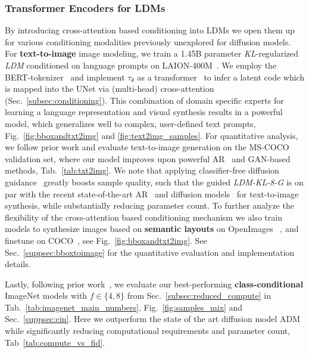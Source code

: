 \documentclass[10pt,twocolumn,letterpaper]{article}
\begin{document}
\subsubsection{Transformer Encoders for LDMs}
%
\label{subsubsec:crossattn2img}
\vspace{-0.5em}
By introducing cross-attention based conditioning into LDMs
we open them up for various
%
 conditioning modalities previously unexplored for diffusion models. 
%
%
%
%
For \textbf{text-to-image} image modeling, we train a 1.45B parameter \emph{KL}-regularized \emph{LDM} conditioned on language prompts on LAION-400M~\cite{schuhmann2021laion400m}. 
We employ the BERT-tokenizer~\cite{DBLP:journals/corr/abs-1810-04805} and implement $\tau_\theta$ as a transformer~\cite{DBLP:conf/nips/VaswaniSPUJGKP17} to infer a latent code which 
%
is mapped into the UNet via (multi-head) cross-attention (Sec.~\ref{subsec:conditioning}).
%
%
%
%
%
%
This combination of domain specific experts for learning a language representation and visual synthesis results in a powerful model, which generalizes well to complex, user-defined text prompts, \cf Fig.~\ref{fig:bboxandtxt2img} and \ref{fig:text2img_samples}. %
For quantitative analysis, we follow prior work and evaluate text-to-image generation on the MS-COCO~\cite{DBLP:journals/corr/LinMBHPRDZ14} validation set, where our model improves upon powerful AR~\cite{DBLP:journals/corr/abs-2102-12092,DBLP:journals/corr/abs-2105-13290} and GAN-based~\cite{DBLP:journals/corr/abs-2111-13792} methods, \cf Tab.~\ref{tab:txt2img}. We note that applying classifier-free diffusion guidance~\cite{ho2021classifier} greatly boosts sample quality, such that the guided \emph{LDM-KL-8-G} is on par with the recent state-of-the-art AR~\cite{DBLP:journals/corr/abs-2203-13131} and diffusion models~\cite{DBLP:journals/corr/abs-2112-10741} for text-to-image synthesis, while substantially reducing parameter count.
%
%
%
%
%
%
%
%
%
%
%
%
%
To further analyze the flexibility of the cross-attention based conditioning mechanism we also train models to synthesize images based on \textbf{semantic layouts} on OpenImages ~\cite{DBLP:journals/corr/abs-1811-00982},
%
and finetune on COCO~\cite{DBLP:conf/cvpr/CaesarUF18}, see Fig.~\ref{fig:bboxandtxt2img}.
%
See Sec.~\ref{suppsec:bboxtoimage} for the quantitative evaluation and implementation details.

Lastly, following prior work~\cite{DBLP:journals/corr/abs-2105-05233,bigganbrock,DBLP:journals/corr/abs-2012-09841,DBLP:journals/corr/abs-2108-08827}, we evaluate our best-performing \textbf{class-conditional} ImageNet models with $f\in\{4,8\}$ from Sec.~\ref{subsec:reduced_compute} %
in Tab.~\ref{tab:imagenet_main_numbers}, Fig.~\ref{fig:samples_mix} and 
Sec.~\ref{suppsec:cin}. Here we outperform the state of the art diffusion model ADM~\cite{DBLP:journals/corr/abs-2105-05233} while significantly reducing computational requirements and parameter count, \cf Tab~\ref{tab:compute_vs_fid}.
%
\cinmainmetrics
%
\end{document}
